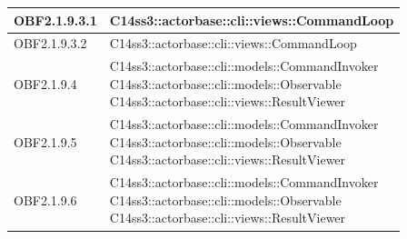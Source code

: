 \documentclass{scalatekids-article}
\begin{document}
\begin{longtable}[H]{|p{4.5cm}|p{13cm}|}
\hline
OBF2.1.9.3.1 & \multiLineCell[t]{C14ss3::actorbase::cli::views::CommandLoop\\}\\
\hline
OBF2.1.9.3.2 & \multiLineCell[t]{C14ss3::actorbase::cli::views::CommandLoop\\}\\
\hline
OBF2.1.9.4 & \multiLineCell[t]{C14ss3::actorbase::cli::models::CommandInvoker\\C14ss3::actorbase::cli::models::Observable\\C14ss3::actorbase::cli::views::ResultViewer\\}\\
\hline
OBF2.1.9.5 & \multiLineCell[t]{C14ss3::actorbase::cli::models::CommandInvoker\\C14ss3::actorbase::cli::models::Observable\\C14ss3::actorbase::cli::views::ResultViewer\\}\\
\hline
OBF2.1.9.6 & \multiLineCell[t]{C14ss3::actorbase::cli::models::CommandInvoker\\C14ss3::actorbase::cli::models::Observable\\C14ss3::actorbase::cli::views::ResultViewer\\}\\
\hline
\end{longtable}

\newpage
\appendix
\label{sec:appendice}

\newpage
\listoftables
\newpage
\listoffigures
\end{document}
